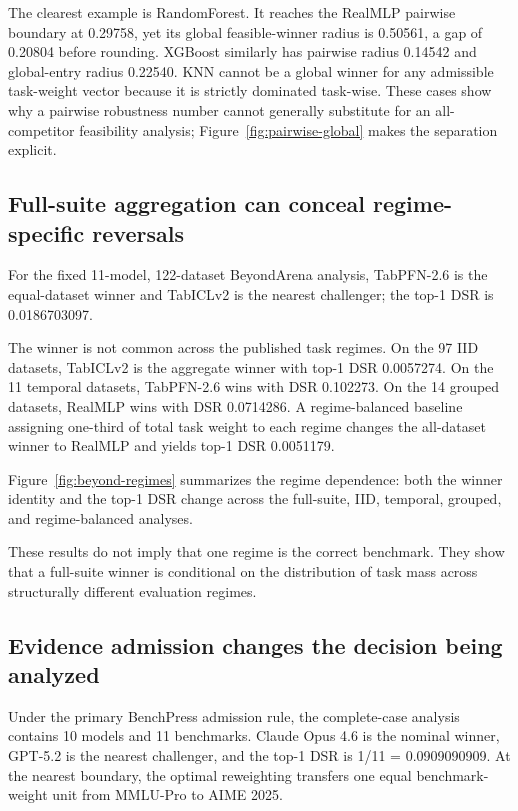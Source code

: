 \documentclass[11pt]{article}
\begin{document}
The clearest example is RandomForest. It reaches the RealMLP pairwise boundary at 0.29758, yet its global feasible-winner radius is 0.50561, a gap of 0.20804 before rounding. XGBoost similarly has pairwise radius 0.14542 and global-entry radius 0.22540. KNN cannot be a global winner for any admissible task-weight vector because it is strictly dominated task-wise. These cases show why a pairwise robustness number cannot generally substitute for an all-competitor feasibility analysis; Figure~\ref{fig:pairwise-global} makes the separation explicit.



\subsection{Full-suite aggregation can conceal regime-specific reversals}

For the fixed 11-model, 122-dataset BeyondArena analysis, TabPFN-2.6 is the equal-dataset winner and TabICLv2 is the nearest challenger; the top-1 DSR is 0.0186703097.

The winner is not common across the published task regimes. On the 97 IID datasets, TabICLv2 is the aggregate winner with top-1 DSR 0.0057274. On the 11 temporal datasets, TabPFN-2.6 wins with DSR 0.102273. On the 14 grouped datasets, RealMLP wins with DSR 0.0714286. A regime-balanced baseline assigning one-third of total task weight to each regime changes the all-dataset winner to RealMLP and yields top-1 DSR 0.0051179.

Figure~\ref{fig:beyond-regimes} summarizes the regime dependence: both the winner identity and the top-1 DSR change across the full-suite, IID, temporal, grouped, and regime-balanced analyses.



These results do not imply that one regime is the correct benchmark. They show that a full-suite winner is conditional on the distribution of task mass across structurally different evaluation regimes.

\subsection{Evidence admission changes the decision being analyzed}

Under the primary BenchPress admission rule, the complete-case analysis contains 10 models and 11 benchmarks. Claude Opus 4.6 is the nominal winner, GPT-5.2 is the nearest challenger, and the top-1 DSR is 1/11 = 0.0909090909. At the nearest boundary, the optimal reweighting transfers one equal benchmark-weight unit from MMLU-Pro to AIME 2025.
\end{document}
